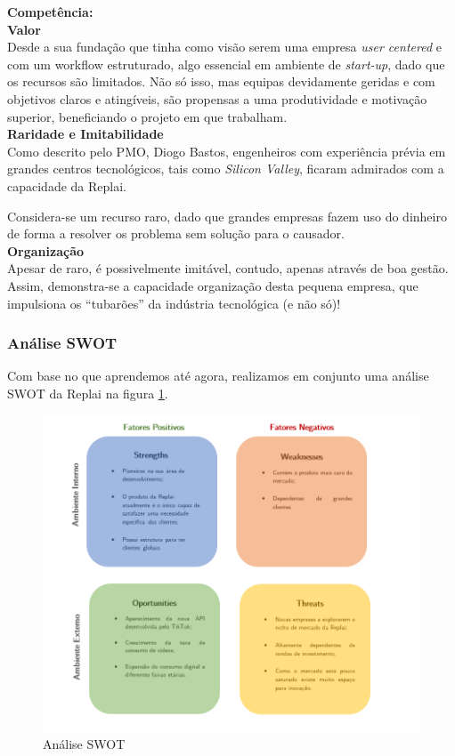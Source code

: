 \noindent \textbf{Competência:}\\

\noindent \textbf{Valor}\\

Desde a sua fundação que tinha como visão serem uma empresa \textit{user centered} e com um workflow estruturado, algo essencial em ambiente de \textit{start-up}, dado que os recursos são limitados. Não só isso, mas equipas devidamente geridas e com objetivos claros e atingíveis, são propensas a uma produtividade e motivação superior, beneficiando o projeto em que trabalham.\\

\noindent \textbf{Raridade e Imitabilidade}\\
  
Como descrito pelo PMO, Diogo Bastos, engenheiros com experiência prévia em grandes centros tecnológicos, tais como \textit{Silicon Valley}, ficaram admirados com a capacidade da Replai.

Considera-se um recurso raro, dado que grandes empresas fazem uso do dinheiro de forma a resolver os problema sem solução para o causador.\\

\noindent \textbf{Organização}\\

Apesar de raro, é possivelmente imitável, contudo, apenas através de boa gestão. Assim, demonstra-se a capacidade organização desta pequena empresa, que impulsiona os “tubarões” da indústria tecnológica (e não só)! 
 

\subsubsection{Análise SWOT}
Com base no que aprendemos até agora, realizamos em conjunto uma análise SWOT da Replai na figura \ref{fig:swot}.\\
\begin{figure}[ht]
    \hspace*{-2.5cm}   
    \centering
    \includegraphics[scale=0.8]{images/SWOT.png}
    \caption{Análise SWOT}
    \label{fig:swot}
\end{figure}

